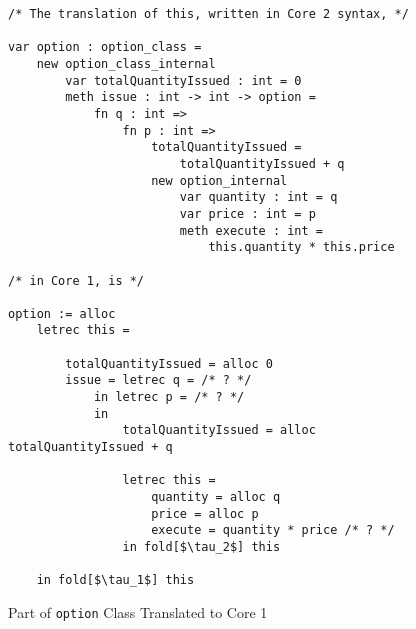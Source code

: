 \begin{figure*}
  \centering
\begin{lstlisting}
/* The translation of this, written in Core 2 syntax, */

var option : option_class =
	new option_class_internal
		var totalQuantityIssued : int = 0
		meth issue : int -> int -> option =
			fn q : int =>
				fn p : int =>
					totalQuantityIssued =
						totalQuantityIssued + q
					new option_internal
						var quantity : int = q
						var price : int = p
						meth execute : int =
							this.quantity * this.price

/* in Core 1, is */

option := alloc 
	letrec this =

		totalQuantityIssued = alloc 0
		issue = letrec q = /* ? */
			in letrec p = /* ? */
			in
				totalQuantityIssued = alloc totalQuantityIssued + q

				letrec this =
					quantity = alloc q
					price = alloc p
					execute = quantity * price /* ? */
				in fold[$\tau_2$] this

	in fold[$\tau_1$] this
\end{lstlisting}
\caption{Part of \texttt{option} Class Translated to Core 1}
\label{f-example-translated-2}
\end{figure*}
